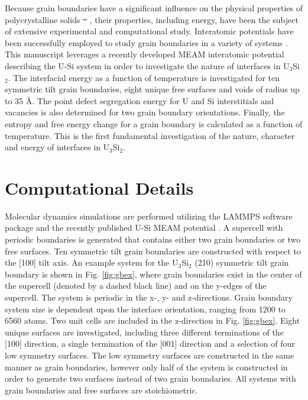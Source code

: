 \documentclass[review]{elsarticle}
\providecommand{\DIFaddtex}[1]{{\protect\color{blue}\uwave{#1}}} %
\providecommand{\DIFdeltex}[1]{{\protect\color{red}\sout{#1}}}                      %
\providecommand{\DIFaddbegin}{} %
\providecommand{\DIFaddend}{} %
\providecommand{\DIFdelbegin}{} %
\providecommand{\DIFdelend}{} %
\providecommand{\DIFadd}[1]{\texorpdfstring{\DIFaddtex{#1}}{#1}} %
\providecommand{\DIFdel}[1]{\texorpdfstring{\DIFdeltex{#1}}{}} %
\newcommand{\DIFscaledelfig}{0.5}
\newlength{\DIFdelgraphicswidth} %
\newlength{\DIFdelgraphicsheight} %
\newcommand{\DIFaddincludegraphics}[2][]{{\color{blue}\fbox{\DIFOincludegraphics[#1]{#2}}}} %
\newcommand{\DIFdelincludegraphics}[2][]{%
\sbox{\DIFdelgraphicsbox}{\DIFOincludegraphics[#1]{#2}}%
\settoboxwidth{\DIFdelgraphicswidth}{\DIFdelgraphicsbox} %
\settoboxtotalheight{\DIFdelgraphicsheight}{\DIFdelgraphicsbox} %
\scalebox{\DIFscaledelfig}{%
\parbox[b]{\DIFdelgraphicswidth}{\usebox{\DIFdelgraphicsbox}\\[-\baselineskip] \rule{\DIFdelgraphicswidth}{0em}}\llap{\resizebox{\DIFdelgraphicswidth}{\DIFdelgraphicsheight}{%
\setlength{\unitlength}{\DIFdelgraphicswidth}%
\begin{picture}(1,1)%
\thicklines\linethickness{2pt} %
{\color[rgb]{1,0,0}\put(0,0){\framebox(1,1){}}}%
{\color[rgb]{1,0,0}\put(0,0){\line( 1,1){1}}}%
{\color[rgb]{1,0,0}\put(0,1){\line(1,-1){1}}}%
\end{picture}%
}\hspace*{3pt}}} %
} %
\DeclareRobustCommand{\DIFaddbegin}{\DIFOaddbegin \let\includegraphics\DIFaddincludegraphics} %
\DeclareRobustCommand{\DIFaddend}{\DIFOaddend \let\includegraphics\DIFOincludegraphics} %
\DeclareRobustCommand{\DIFdelbegin}{\DIFOdelbegin \let\includegraphics\DIFdelincludegraphics} %
\DeclareRobustCommand{\DIFdelend}{\DIFOaddend \let\includegraphics\DIFOincludegraphics} %
\begin{document}
Because grain boundaries have a significant influence on the physical properties of polycrystalline solids \DIFdelbegin \DIFdel{\mbox{%
\cite{brandon2010, harmer2010}}\hspace{0pt}%
}\DIFdelend \DIFaddbegin \DIFadd{\mbox{%
\cite{brandon2010, harmer2010, zhang2016, zhang2019}}\hspace{0pt}%
}\DIFaddend , their properties, including energy, have been the subject of extensive experimental and computational study. Interatomic potentials have been successfully employed to study grain boundaries in a variety of systems \cite{morita1997, wolf1989bcc1, wolf1990bcc2, ratanaphan2015, novoselov2014, tschopp2012probing, hahn2016}. This manuscript leverages a recently developed MEAM interatomic potential describing the U-Si system in order to investigate the nature of interfaces in U$_{3}$Si$_{2}$. The interfacial energy as a function of temperature is investigated for ten symmetric tilt grain boundaries, eight unique free surfaces and voids of radius up to 35 {\AA}. The point defect segregation energy for U and Si interstitials and vacancies is also determined for two grain boundary orientations. Finally, the entropy and free energy change for a grain boundary is calculated as a function of temperature. This is the first fundamental investigation of the nature, character and energy of interfaces in U$_{3}$Si$_{2}$. 

\section{Computational Details}
Molecular dynamics simulations are performed utilizing the LAMMPS \cite{plimpton1995} software package and the recently published U-Si MEAM potential \cite{beelerUSi}. A supercell with periodic boundaries is generated that contains either two grain boundaries or two free surfaces. Ten symmetric tilt grain boundaries are constructed with respect to the [100] tilt axis. An example system for the U$_{3}$Si$_{2}$ (210) symmetric tilt grain boundary is shown in Fig. \ref{fig:gbex}, where grain boundaries exist in the center of the supercell (denoted by a dashed black line) and on the y-edges of the supercell. The system is periodic in the x-, y- and z-directions. Grain boundary system size is dependent upon the interface orientation, ranging from 1200 to 6560 atoms. Two unit cells are included in the z-direction in Fig. \ref{fig:gbex}. Eight unique surfaces are investigated, including three different terminations of the [100] direction, a single termination of the [001] direction and a selection of four low symmetry surfaces. The low symmetry surfaces are constructed in the same manner as grain boundaries, however only half of the system is constructed in order to generate two surfaces instead of two grain boundaries. All systems with grain boundaries and free surfaces are stoichiometric. 
\end{document}
